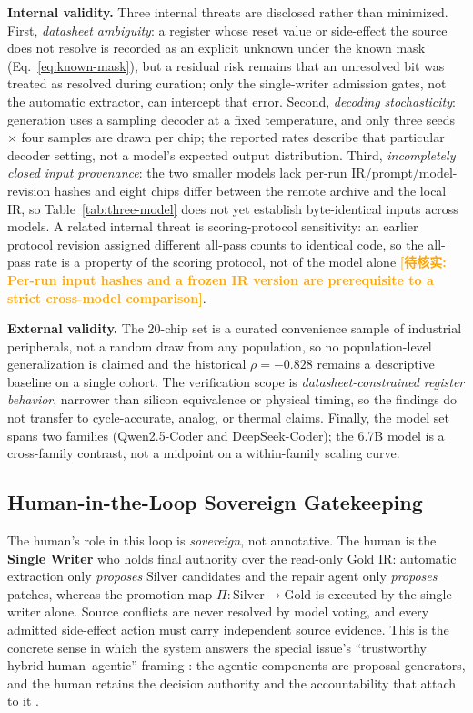 \documentclass[preprint,review]{elsarticle}
\theoremstyle{definition}
\newcommand{\unverified}[1]{\textcolor{orange}{\textbf{[待核实: #1]}}}
\begin{document}
\textbf{Internal validity.} Three internal threats are disclosed rather than minimized.
First, \emph{datasheet ambiguity}: a register whose reset value or side-effect the source
does not resolve is recorded as an explicit unknown under the known mask
(Eq.~\eqref{eq:known-mask}), but a residual risk remains that an unresolved bit was treated
as resolved during curation; only the single-writer admission gates, not the automatic
extractor, can intercept that error. Second, \emph{decoding stochasticity}: generation uses a
sampling decoder at a fixed temperature, and only three seeds $\times$ four samples are drawn
per chip; the reported rates describe that particular decoder setting, not a model's expected
output distribution. Third, \emph{incompletely closed input provenance}: the two smaller
models lack per-run IR/prompt/model-revision hashes and eight chips differ between the remote
archive and the local IR, so Table~\ref{tab:three-model} does not yet establish byte-identical
inputs across models. A related internal threat is scoring-protocol sensitivity: an earlier
protocol revision assigned different all-pass counts to identical code, so the all-pass rate is
a property of the scoring protocol, not of the model alone \unverified{Per-run input hashes and
a frozen IR version are prerequisite to a strict cross-model comparison}.

\textbf{External validity.} The 20-chip set is a curated convenience sample of industrial
peripherals, not a random draw from any population, so no population-level generalization is
claimed and the historical $\rho=-0.828$ remains a descriptive baseline on a single cohort.
The verification scope is \emph{datasheet-constrained register behavior}, narrower than
silicon equivalence or physical timing, so the findings do not transfer to cycle-accurate,
analog, or thermal claims. Finally, the model set spans two families (Qwen2.5-Coder and
DeepSeek-Coder); the 6.7B model is a cross-family contrast, not a midpoint on a
within-family scaling curve.

\subsection{Human-in-the-Loop Sovereign Gatekeeping}
\label{sec:sovereign}

The human's role in this loop is \emph{sovereign}, not annotative. The human is the
\textbf{Single Writer} who holds final authority over the read-only Gold IR: automatic
extraction only \emph{proposes} Silver candidates and the repair agent only \emph{proposes}
patches, whereas the promotion map $\Pi:\mathrm{Silver}\rightarrow\mathrm{Gold}$ is executed
by the single writer alone. Source conflicts are never resolved by model voting, and every
admitted side-effect action must carry independent source evidence. This is the concrete
sense in which the system answers the special issue's ``trustworthy hybrid human--agentic''
framing \cite{trappey2026human}: the agentic components are proposal generators, and the human retains the decision
authority and the accountability that attach to it \cite{zhou2025examining,palmer2025personas,aslam2023conceptual,lyu2024valio}.
\end{document}
